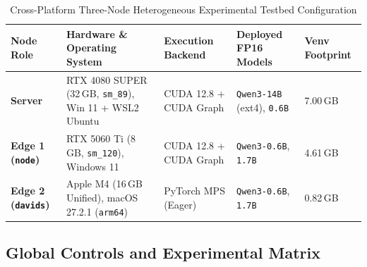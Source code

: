 \documentclass[10pt,conference]{IEEEtran}
\begin{document}
\begin{table}[t]
  \centering
  \caption{Cross-Platform Three-Node Heterogeneous Experimental Testbed Configuration}
  \label{tab:hw}
  \begin{tabular}{lllll}
    \toprule
    Node Role & Hardware \& Operating System & Execution Backend & Deployed FP16 Models & Venv Footprint \\
    \midrule
    \textbf{Server} & RTX 4080 SUPER (32\,GB, \texttt{sm\_89}), Win 11 + WSL2 Ubuntu & CUDA 12.8 + CUDA Graph & \texttt{Qwen3-14B} (ext4), \texttt{0.6B} & 7.00\,GB \\
    \textbf{Edge 1 (\texttt{node})} & RTX 5060 Ti (8\,GB, \texttt{sm\_120}), Windows 11 & CUDA 12.8 + CUDA Graph & \texttt{Qwen3-0.6B}, \texttt{1.7B} & 4.61\,GB \\
    \textbf{Edge 2 (\texttt{davids})} & Apple M4 (16\,GB Unified), macOS 27.2.1 (\texttt{arm64}) & PyTorch MPS (Eager) & \texttt{Qwen3-0.6B}, \texttt{1.7B} & 0.82\,GB \\
    \bottomrule
  \end{tabular}
\end{table}

\subsection{Global Controls and Experimental Matrix}
\end{document}
